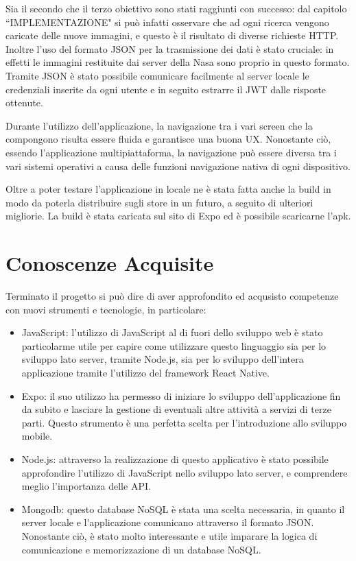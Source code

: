 Sia il secondo che il terzo obiettivo sono stati raggiunti con successo: dal capitolo ``IMPLEMENTAZIONE" si pu\`o infatti osservare che ad ogni ricerca vengono caricate delle nuove immagini, e questo \`e il risultato
di diverse richieste HTTP. Inoltre l'uso del formato JSON per la trasmissione dei dati \`e stato cruciale: in effetti le immagini restituite dai server della Nasa sono proprio in questo formato. Tramite JSON \`e stato possibile comunicare facilmente al server locale
le credenziali inserite da ogni utente e in seguito estrarre il JWT dalle risposte ottenute.

Durante l'utilizzo dell'applicazione, la navigazione tra i vari screen che la compongono risulta essere fluida e garantisce una buona UX. Nonostante ci\`o,
essendo l'applicazione multipiattaforma, la navigazione pu\`o essere diversa tra i vari sistemi operativi a causa delle funzioni navigazione nativa di ogni dispositivo.

Oltre a poter testare l'applicazione in locale ne \`e stata fatta anche la build in modo da poterla distribuire sugli store in un futuro, a seguito di ulteriori migliorie.
La build \`e stata caricata sul sito di Expo ed \`e possibile scaricarne l'apk.

\section{Conoscenze Acquisite}
Terminato il progetto si pu\`o dire di aver approfondito ed acqusisto competenze con nuovi strumenti e tecnologie, in particolare:
\begin{itemize}
    \item JavaScript: l'utilizzo di JavaScript al di fuori dello sviluppo web \`e stato particolarme utile per capire come utilizzare questo linguaggio sia per lo sviluppo
          lato server, tramite Node.js, sia per lo sviluppo dell'intera applicazione tramite l'utilizzo del framework React Native.
    \item Expo: il suo utilizzo ha permesso di iniziare lo sviluppo dell'applicazione fin da subito e lasciare la gestione di eventuali altre attivit\`a a servizi di terze parti. Questo strumento \`e
          una perfetta scelta per l'introduzione allo sviluppo mobile.
    \item Node.js: attraverso la realizzazione di questo applicativo \`e stato possibile approfondire l'utilizzo di JavaScript nello sviluppo lato server, e comprendere meglio l'importanza delle API.
    \item Mongodb: questo database NoSQL \`e stata una scelta necessaria, in quanto il server locale e l'applicazione comunicano attraverso il formato JSON. Nonostante ci\`o, \`e stato molto interessante
          e utile imparare la logica di comunicazione e memorizzazione di un database NoSQL.
\end{itemize}

